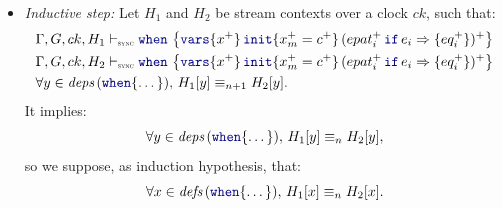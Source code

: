 \begin{skippableproof}
\begin{itemize}
        \item \textit{Inductive step:} Let $H_1$ and $H_2$ be stream contexts over
              a clock $ck$, such that:
              \begin{align*}
                   & \eqDenot{H_1}{ck}{\when{x^+}{x_m^+ = c^+}{(\branch{epat_i^+}{e_i}{eq_i^+})^+}} \\
                   & \eqDenot{H_2}{ck}{\when{x^+}{x_m^+ = c^+}{(\branch{epat_i^+}{e_i}{eq_i^+})^+}} \\
                   & \forall y \in \deps{\kwf{when}\{ \dots \}}, \, H_1[y] \equiv_{n+1} H_2[y].
              \end{align*}
              It implies:
              \begin{equation*}
                  \forall y \in \deps{\kwf{when}\{ \dots \}}, \, H_1[y] \equiv_n H_2[y],
              \end{equation*}
              so we suppose, as induction hypothesis, that:
              \begin{equation*}
                  \forall x \in \defs{\kwf{when}\{ \dots \}}, \, H_1[x] \equiv_n H_2[x].
              \end{equation*}


\end{itemize}
\end{skippableproof}
